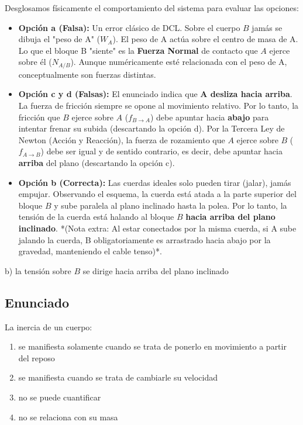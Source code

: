 \documentclass[12pt, a4paper]{article}
\begin{document}
Desglosamos físicamente el comportamiento del sistema para evaluar las opciones:
\begin{itemize}
    \item \textbf{Opción a (Falsa):} Un error clásico de DCL. Sobre el cuerpo $B$ jamás se dibuja el "peso de A" ($W_A$). El peso de A actúa sobre el centro de masa de A. Lo que el bloque B "siente" es la \textbf{Fuerza Normal} de contacto que $A$ ejerce sobre él ($N_{A/B}$). Aunque numéricamente esté relacionada con el peso de A, conceptualmente son fuerzas distintas.
    
    \item \textbf{Opción c y d (Falsas):} El enunciado indica que \textbf{A desliza hacia arriba}. La fuerza de fricción siempre se opone al movimiento relativo. 
    Por lo tanto, la fricción que $B$ ejerce sobre $A$ ($f_{B \to A}$) debe apuntar hacia \textbf{abajo} para intentar frenar su subida (descartando la opción d). 
    Por la Tercera Ley de Newton (Acción y Reacción), la fuerza de rozamiento que $A$ ejerce sobre $B$ ($f_{A \to B}$) debe ser igual y de sentido contrario, es decir, debe apuntar hacia \textbf{arriba} del plano (descartando la opción c).
    
    \item \textbf{Opción b (Correcta):} Las cuerdas ideales solo pueden tirar (jalar), jamás empujar. Observando el esquema, la cuerda está atada a la parte superior del bloque $B$ y sube paralela al plano inclinado hasta la polea. Por lo tanto, la tensión de la cuerda está halando al bloque $B$ \textbf{hacia arriba del plano inclinado}. 
    *(Nota extra: Al estar conectados por la misma cuerda, si A sube jalando la cuerda, B obligatoriamente es arrastrado hacia abajo por la gravedad, manteniendo el cable tenso)*.
\end{itemize}

\begin{tcolorbox}[colback=green!5!white, colframe=green!50!black, title=Respuesta Final]
\centering \Large b) la tensión sobre $B$ se dirige hacia arriba del plano inclinado
\end{tcolorbox}

\newpage

\subsection*{Enunciado}
La inercia de un cuerpo:
\begin{enumerate}[label=\alph*)]
    \item se manifiesta solamente cuando se trata de ponerlo en movimiento a partir del reposo
    \item se manifiesta cuando se trata de cambiarle su velocidad
    \item no se puede cuantificar
    \item no se relaciona con su masa
\end{enumerate}
\end{document}
